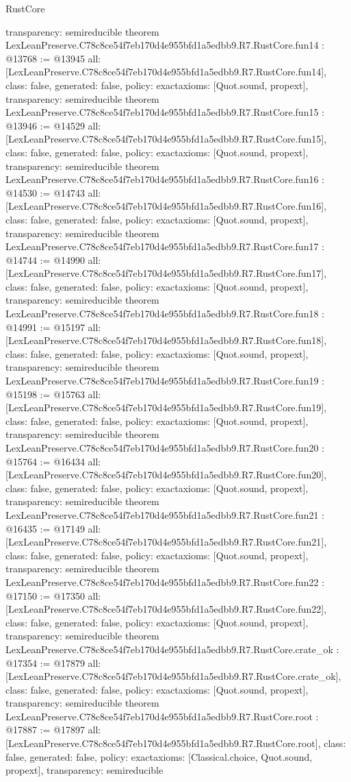 \begin{lexlean}{RustCore}
\begin{coremodule}
{  transparency: semireducible
}
theorem LexLeanPreserve.C78c8ce54f7eb170d4e955bfd1a5edbb9.R7.RustCore.fun14 : @13768 := @13945 {
  all: [LexLeanPreserve.C78c8ce54f7eb170d4e955bfd1a5edbb9.R7.RustCore.fun14],
  class: false,
  generated: false,
  policy: exact{axioms: [Quot.sound, propext]},
  transparency: semireducible
}
theorem LexLeanPreserve.C78c8ce54f7eb170d4e955bfd1a5edbb9.R7.RustCore.fun15 : @13946 := @14529 {
  all: [LexLeanPreserve.C78c8ce54f7eb170d4e955bfd1a5edbb9.R7.RustCore.fun15],
  class: false,
  generated: false,
  policy: exact{axioms: [Quot.sound, propext]},
  transparency: semireducible
}
theorem LexLeanPreserve.C78c8ce54f7eb170d4e955bfd1a5edbb9.R7.RustCore.fun16 : @14530 := @14743 {
  all: [LexLeanPreserve.C78c8ce54f7eb170d4e955bfd1a5edbb9.R7.RustCore.fun16],
  class: false,
  generated: false,
  policy: exact{axioms: [Quot.sound, propext]},
  transparency: semireducible
}
theorem LexLeanPreserve.C78c8ce54f7eb170d4e955bfd1a5edbb9.R7.RustCore.fun17 : @14744 := @14990 {
  all: [LexLeanPreserve.C78c8ce54f7eb170d4e955bfd1a5edbb9.R7.RustCore.fun17],
  class: false,
  generated: false,
  policy: exact{axioms: [Quot.sound, propext]},
  transparency: semireducible
}
theorem LexLeanPreserve.C78c8ce54f7eb170d4e955bfd1a5edbb9.R7.RustCore.fun18 : @14991 := @15197 {
  all: [LexLeanPreserve.C78c8ce54f7eb170d4e955bfd1a5edbb9.R7.RustCore.fun18],
  class: false,
  generated: false,
  policy: exact{axioms: [Quot.sound, propext]},
  transparency: semireducible
}
theorem LexLeanPreserve.C78c8ce54f7eb170d4e955bfd1a5edbb9.R7.RustCore.fun19 : @15198 := @15763 {
  all: [LexLeanPreserve.C78c8ce54f7eb170d4e955bfd1a5edbb9.R7.RustCore.fun19],
  class: false,
  generated: false,
  policy: exact{axioms: [Quot.sound, propext]},
  transparency: semireducible
}
theorem LexLeanPreserve.C78c8ce54f7eb170d4e955bfd1a5edbb9.R7.RustCore.fun20 : @15764 := @16434 {
  all: [LexLeanPreserve.C78c8ce54f7eb170d4e955bfd1a5edbb9.R7.RustCore.fun20],
  class: false,
  generated: false,
  policy: exact{axioms: [Quot.sound, propext]},
  transparency: semireducible
}
theorem LexLeanPreserve.C78c8ce54f7eb170d4e955bfd1a5edbb9.R7.RustCore.fun21 : @16435 := @17149 {
  all: [LexLeanPreserve.C78c8ce54f7eb170d4e955bfd1a5edbb9.R7.RustCore.fun21],
  class: false,
  generated: false,
  policy: exact{axioms: [Quot.sound, propext]},
  transparency: semireducible
}
theorem LexLeanPreserve.C78c8ce54f7eb170d4e955bfd1a5edbb9.R7.RustCore.fun22 : @17150 := @17350 {
  all: [LexLeanPreserve.C78c8ce54f7eb170d4e955bfd1a5edbb9.R7.RustCore.fun22],
  class: false,
  generated: false,
  policy: exact{axioms: [Quot.sound, propext]},
  transparency: semireducible
}
theorem LexLeanPreserve.C78c8ce54f7eb170d4e955bfd1a5edbb9.R7.RustCore.crate_ok : @17354 := @17879 {
  all: [LexLeanPreserve.C78c8ce54f7eb170d4e955bfd1a5edbb9.R7.RustCore.crate_ok],
  class: false,
  generated: false,
  policy: exact{axioms: [Quot.sound, propext]},
  transparency: semireducible
}
theorem LexLeanPreserve.C78c8ce54f7eb170d4e955bfd1a5edbb9.R7.RustCore.root : @17887 := @17897 {
  all: [LexLeanPreserve.C78c8ce54f7eb170d4e955bfd1a5edbb9.R7.RustCore.root],
  class: false,
  generated: false,
  policy: exact{axioms: [Classical.choice, Quot.sound, propext]},
  transparency: semireducible
}


\end{coremodule}
\end{lexlean}
